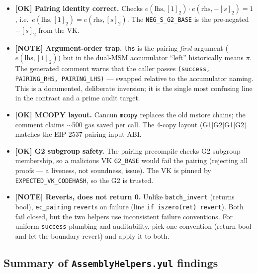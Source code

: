 \begin{itemize}
  \item \textcolor{tracegreen}{\textbf{[OK] Pairing identity correct.}}
        Checks $e(\text{lhs},[1]_2)\cdot e(\text{rhs},-[s]_2)=1$,
        i.e.\ $e(\text{lhs},[1]_2)=e(\text{rhs},[s]_2)$. The
        \texttt{NEG\_S\_G2\_BASE} is the pre-negated $-[s]_2$ from the
        VK.
  \item \textcolor{mathpurple}{\textbf{[NOTE] Argument-order trap.}}
        \texttt{lhs} is the pairing \emph{first} argument
        ($e(\text{lhs},[1]_2)$) but in the dual-MSM accumulator
        ``left'' historically means $\pi$. The generated comment warns
        that the caller passes \texttt{(success, PAIRING\_\allowbreak{}RHS,
        PAIRING\_\allowbreak{}LHS)} --- swapped relative to the accumulator naming.
        This is a documented, deliberate inversion; it is the single
        most confusing line in the contract and a prime audit target.
  \item \textcolor{tracegreen}{\textbf{[OK] MCOPY layout.}} Cancun
        \texttt{mcopy} replaces the old mstore chains; the comment
        claims $\sim$500 gas saved per call. The 4-copy layout
        (G1|G2|G1|G2) matches the EIP-2537 pairing input ABI.
  \item \textcolor{tracegreen}{\textbf{[OK] G2 subgroup safety.}} The
        pairing precompile checks G2 subgroup membership, so a malicious
        VK \texttt{G2\_BASE} would fail the pairing (rejecting all
        proofs --- a liveness, not soundness, issue). The VK is pinned
        by \texttt{EXPECTED\_\allowbreak{}VK\_\allowbreak{}CODEHASH}, so the G2 is trusted.
  \item \textcolor{mathpurple}{\textbf{[NOTE] Reverts, does not return
        0.}} Unlike \texttt{batch\_invert} (returns bool),
        \texttt{ec\_pairing} \texttt{revert}s on failure (line
        \texttt{if iszero(ret) revert}). Both fail closed, but the two
        helpers use inconsistent failure conventions. For uniform
        \texttt{success}-plumbing and auditability, pick one convention
        (return-bool and let the boundary revert) and apply it to both.
\end{itemize}

\subsection{Summary of \texttt{AssemblyHelpers.yul} findings}

